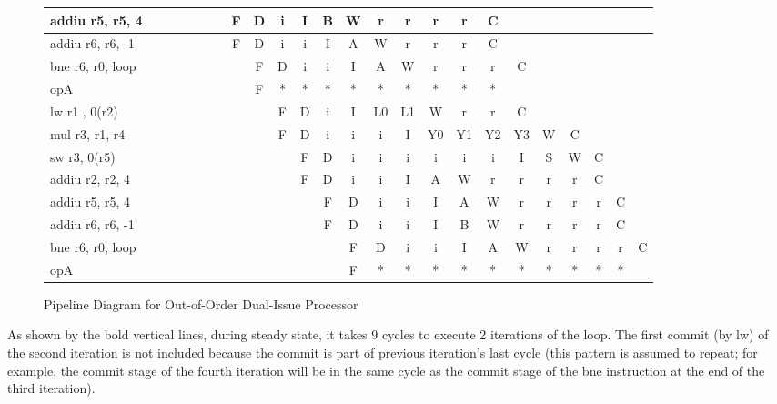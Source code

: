 \documentclass[10pt]{article}
\begin{document}
\begin{figure}[H]
{\begin{tabular}{|l|c|c|c|c|c|c|c|c|c|c|c|c|c|c!{\vrule width 1.5pt}c|c|c|c|c|c|c|c|c!{\vrule width 1.5pt}}
addiu r5, r5, 4   &    &    &    &    &    &    & F  & D  & i  & I  & B  & W  & r  & r  & r  & r  & C  &    &    &    &    &    &    \\ \hline
addiu r6, r6, -1  &    &    &    &    &    &    & F  & D  & i  & i  & I  & A  & W  & r  & r  & r  & C  &    &    &    &    &    &    \\ \hline
bne r6, r0, loop  &    &    &    &    &    &    &    & F  & D  & i  & i  & I  & A  & W  & r  & r  & r  & C  &    &    &    &    &    \\ \hline
opA               &    &    &    &    &    &    &    & F  & *  & *  & *  & *  & *  & *  & *  & *  & *  &    &    &    &    &    &    \\ \hline
lw r1 , 0(r2)     &    &    &    &    &    &    &    &    & F  & D  & i  & I  & L0 & L1 & W  & r  & r  & C  &    &    &    &    &    \\ \hline
mul r3, r1, r4    &    &    &    &    &    &    &    &    & F  & D  & i  & i  & i  & I  & Y0 & Y1 & Y2 & Y3 & W  & C  &    &    &    \\ \hline
sw r3, 0(r5)      &    &    &    &    &    &    &    &    &    & F  & D  & i  & i  & i  & i  & i  & i  & I  & S  & W  & C  &    &    \\ \hline
addiu r2, r2, 4   &    &    &    &    &    &    &    &    &    & F  & D  & i  & i  & I  & A  & W  & r  & r  & r  & r  & C  &    &    \\ \hline
addiu r5, r5, 4   &    &    &    &    &    &    &    &    &    &    & F  & D  & i  & i  & I  & A  & W  & r  & r  & r  & r  & C  &    \\ \hline
addiu r6, r6, -1  &    &    &    &    &    &    &    &    &    &    & F  & D  & i  & i  & I  & B  & W  & r  & r  & r  & r  & C  &    \\ \hline
bne r6, r0, loop  &    &    &    &    &    &    &    &    &    &    &    & F  & D  & i  & i  & I  & A  & W  & r  & r  & r  & r  & C  \\ \hline
opA               &    &    &    &    &    &    &    &    &    &    &    & F  & *  & *  & *  & *  & *  & *  & *  & *  & *  & *  &    \\ \hline
\end{tabular}
}
\caption{Pipeline Diagram for Out-of-Order Dual-Issue Processor}
\end{figure}
As shown by the bold vertical lines, during steady state, it takes 9 cycles to execute 2 iterations of the loop. The first commit (by lw) of the second iteration is not included because the commit is part of previous iteration's last cycle (this pattern is assumed to repeat; for example, the commit stage of the fourth iteration will be in the same cycle as the commit stage of the bne instruction at the end of the third iteration).
\end{document}
